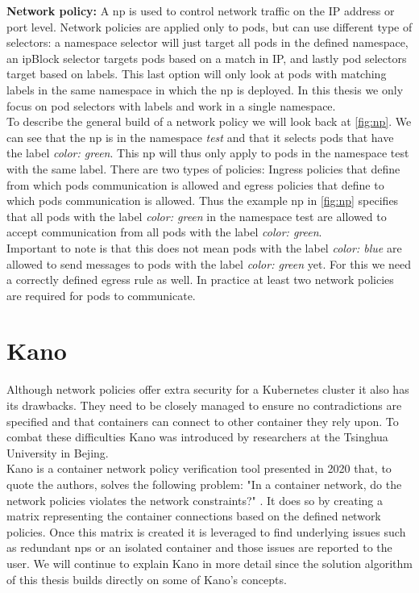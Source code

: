 \textbf{Network policy:} \label{comp:networkpolicy} A \acrfull{np} is used to control network traffic on the IP address or port level. Network policies are applied only to pods, but can use different type of selectors: a namespace selector will just target all pods in the defined namespace, an ipBlock selector targets pods based on a match in IP, and lastly pod selectors target based on labels. This last option will only look at pods with matching labels in the same namespace in which the \acrshort{np} is deployed. In this thesis we only focus on pod selectors with labels and work in a single namespace.
\\[10pt]
To describe the general build of a network policy we will look back at \autoref{fig:np}. We can see that the \acrshort{np} is in the namespace \textit{test} and that it selects pods that have the label \textit{color: green}. This \acrshort{np} will thus only apply to pods in the namespace test with the same label. There are two types of policies: Ingress policies that define from which pods communication is allowed and egress policies that define to which pods communication is allowed. Thus the example \acrshort{np} in \autoref{fig:np} specifies that all pods with the label \textit{color: green} in the namespace test are allowed to accept communication from all pods with the label \textit{color: green}.
\\[10pt]


Important to note is that this does not mean pods with the label \textit{color: blue} are allowed to send messages to pods with the label \textit{color: green} yet. For this we need a correctly defined egress rule as well. In practice at least two network policies are required for pods to communicate. \cite{k8snp}



\section{Kano}\label{sec:kano}
Although network policies offer extra security for a Kubernetes cluster it also has its drawbacks. They need to be closely managed to ensure no contradictions are specified and that containers can connect to other container they rely upon. To combat these difficulties Kano was introduced by researchers at the Tsinghua University in Bejing.
\\[10pt]
Kano is a container network policy verification tool presented in 2020 that, to quote the authors, solves the following problem: "In a container network, do the network
policies violates the network constraints?" \cite{kano}. It does so by creating a matrix representing the container connections based on the defined network policies. Once this matrix is created it is leveraged to find underlying issues such as redundant \acrshort{np}s or an isolated container and those issues are reported to the user. We will continue to explain Kano in more detail since the solution algorithm of this thesis builds directly on some of Kano's concepts.
\\[10pt]

